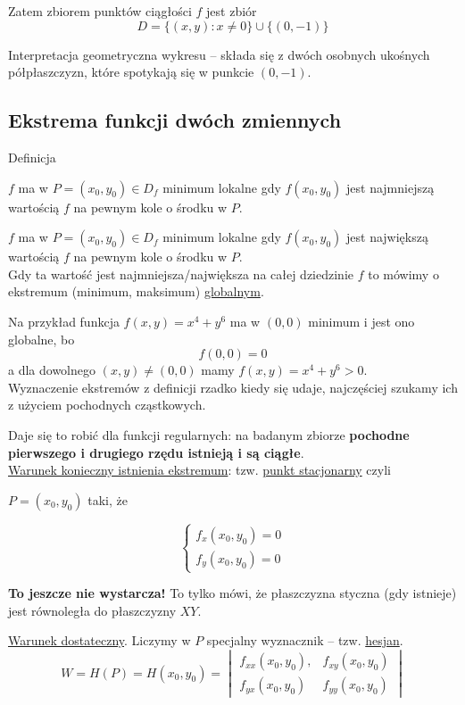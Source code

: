 Zatem zbiorem punktów ciągłości $f$ jest zbiór
$$ D = \{ (x,y) : x \neq 0 \} \cup \{ (0,-1) \} $$

Interpretacja geometryczna wykresu -- składa się z dwóch osobnych ukośnych półpłaszczyzn, które spotykają
się w punkcie $(0, -1) $.


\subsection*{Ekstrema funkcji dwóch zmiennych}

\begin{tw}{Definicja}

$f$ ma w $ P = (x_0, y_0) \in D_f $ minimum lokalne gdy $ f(x_0, y_0) $ jest najmniejszą wartością $f$ na pewnym kole o środku w $P$.

$f$ ma w $ P = (x_0, y_0) \in D_f $ minimum lokalne gdy $ f(x_0, y_0) $ jest największą wartością $f$ na pewnym kole o środku w $P$. \\

Gdy ta wartość jest najmniejsza/największa na całej dziedzinie $f$ to mówimy o ekstremum (minimum, maksimum) \underline{globalnym}.
\end{tw}

Na przykład funkcja $ f(x,y) = x^4 + y^6 $ ma w $(0,0)$ minimum i jest ono globalne, bo
$$ f(0,0) = 0 $$
a dla dowolnego $ (x,y) \neq (0,0) $ mamy $ f(x,y) = x^4 + y^6 > 0 $. \\

Wyznaczenie ekstremów z definicji rzadko kiedy się udaje, najczęściej szukamy ich z użyciem pochodnych cząstkowych.

Daje się to robić dla funkcji regularnych: na badanym zbiorze \textbf{pochodne pierwszego i drugiego rzędu istnieją i są ciągłe}. \\

\underline{Warunek konieczny istnienia ekstremum}: tzw. \underline{punkt stacjonarny} czyli

$ P = (x_0, y_0) $ taki, że 

$$ \left\{ \begin{aligned} f_x(x_0, y_0) = 0 \\ f_y(x_0, y_0) = 0  \end{aligned} \right. $$

\textbf{To jeszcze nie wystarcza!} To tylko mówi, że płaszczyzna styczna (gdy istnieje) jest równoległa do płaszczyzny $XY$.

\underline{Warunek dostateczny}. Liczymy w $P$ specjalny wyznacznik -- tzw. \underline{hesjan}.
$$ W = H(P) = H(x_0, y_0) = \begin{vmatrix} f_{xx}(x_0, y_0), & f_{xy}(x_0, y_0) \\ f_{yx}(x_0, y_0) & f_{yy}(x_0, y_0) \end{vmatrix} $$

